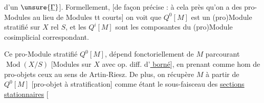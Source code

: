 d'un $\unsure{\underline\Gamma}$]. Formellement, [de façon précise : à cela près qu'on a des pro-Modules au lieu de Modules tt courts] on voit que $Q^0[M]$ est un (pro)Module stratifié sur $X$ rel $S$, et les $Q^i[M]$ sont les composantes du (pro)Module  cosimplicial correspondant.

Ce pro-Module stratifié $Q^0[M]$,  dépend fonctoriellement de $M$ parcourant $\operatorname{Mod}(X/S)$ [Modules sur $X$ avec op. diff.  d'\uline{ borné}], en prenant comme hom de pro-objets ceux au sens de Artin-Riesz.
De plus, on récupère $M$ à partir de $Q^0[M]$ [pro-objet à stratification] comme étant le sous-faisceau des \uline{sections stationnaires} [
